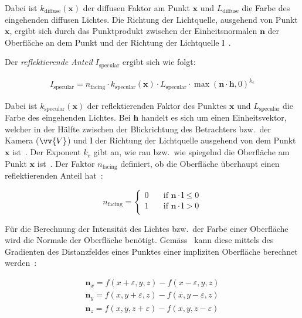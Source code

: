 Dabei ist $k_{\text{diffuse}}(\bm{x})$ der diffusen Faktor am Punkt $\bm{x}$
und $L_{\text{diffuse}}$ die Farbe des eingehenden diffusen Lichtes.
Die Richtung der Lichtquelle, ausgehend von Punkt $\bm{x}$, ergibt sich
durch das Punktprodukt zwischen der Einheitsnormalen $\bm{n}$ der
Oberfläche an dem Punkt und der Richtung der Lichtquelle
$\bm{l}$~\parencites[S. 724]{glassner_introduction_1989}[Kapitel 5, Abschnitt 5.2.1]{fernando_cg_2003}.

Der \textit{reflektierende Anteil} $I_{\text{specular}}$ ergibt sich
wie folgt:

\begin{gather}
    I_{\text{specular}} = n_{\text{facing}} \cdot k_{\text{specular}}(\bm{x}) \cdot L_{\text{specular}} \cdot \max{(\bm{n} \cdot \bm{h}, 0)}^{k_{e}}
\end{gather}

Dabei ist $k_{\text{specular}}(\bm{x})$ der reflektierenden Faktor des
Punktes $\bm{x}$ und $L_{\text{specular}}$ die Farbe des eingehenden
Lichtes. Bei $\bm{h}$ handelt es sich um einen Einheitsvektor,
welcher in der Hälfte zwischen der Blickrichtung des Betrachters bzw.\
der Kamera ($\vv{V}$) und $\bm{l}$ der Richtung der Lichtquelle
ausgehend von dem Punkt $\bm{x}$ ist~\parencite[S.
731]{glassner_introduction_1989}. Der Exponent $k_{e}$ gibt an, wie rau
bzw.\ wie spiegelnd die Oberfläche am Punkt $\bm{x}$
ist~\parencite[Kapitel 5, Abschnitt 5.2.1]{fernando_cg_2003}. Der Faktor
$n_{\text{facing}}$ definiert, ob die Oberfläche überhaupt einen
reflektierenden Anteil hat~\parencite[Kapitel 5, Abschnitt 5.2.1]{fernando_cg_2003}:

\begin{equation}
    n_{\text{facing}} = \begin{cases}
        0 & \quad \text{if } \bm{n} \cdot \bm{l} \leq 0\\
        1 & \quad \text{if } \bm{n} \cdot \bm{l} > 0 \\
    \end{cases}
\end{equation}

Für die Berechnung der Intensität des Lichtes bzw.\ der Farbe einer Oberfläche
wird die Normale der Oberfläche benötigt. Gemäss~\citeauthor{hart_ray_1989}
kann diese mittels des Gradienten des Distanzfeldes
eines Punktes einer impliziten Oberfläche berechnet
werden~\parencite[S. 292 bis 293]{hart_ray_1989}:

\begin{gather}
    \bm{n}_{x} = f(x + \varepsilon, y, z) - f(x - \varepsilon, y, z) \\
    \bm{n}_{y} = f(x, y + \varepsilon,  z) - f(x, y - \varepsilon,  z) \\
    \bm{n}_{z} = f(x, y, z + \varepsilon) - f(x, y, z - \varepsilon) \\
\end{gather}

